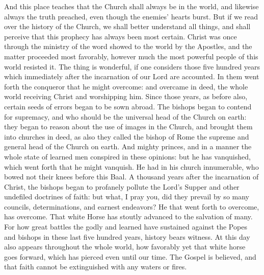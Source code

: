 And this place teaches that the Church shall always be in the world, and likewise always the truth preached, even though the enemies’ hearts burst. But if we read over the history of the Church, we shall better understand all things, and shall perceive that this prophecy has always been most certain. Christ was once through the ministry of the word showed to the world by the Apostles, and the matter proceeded most favorably, however much the most powerful people of this world resisted it. The thing is wonderful, if one considers those five hundred years which immediately after the incarnation of our Lord are accounted. In them went forth the conqueror that he might overcome: and overcame in deed, the whole world receiving Christ and worshipping him. Since those years, as before also, certain seeds of errors began to be sown abroad. The bishops began to contend for supremacy, and who should be the universal head of the Church on earth: they began to reason about the use of images in the Church, and brought them into churches in deed, as also they called the bishop of Rome the supreme and general head of the Church on earth. And mighty princes, and in a manner the whole state of learned men conspired in these opinions: but he has vanquished, which went forth that he might vanquish. He had in his church innumerable, who bowed not their knees before this Baal. A thousand years after the incarnation of Christ, the bishops began to profanely pollute the Lord’s Supper and other undefiled doctrines of faith: but what, I pray you, did they prevail by so many councils, determinations, and earnest endeavors? He that went forth to overcome, has overcome. That white Horse has stoutly advanced to the salvation of many. For how great battles the godly and learned have sustained against the Popes and bishops in these last five hundred years, history bears witness. At this day also appears throughout the whole world, how favorably yet that white horse goes forward, which has pierced even until our time. The Gospel is believed, and that faith cannot be extinguished with any waters or fires.


